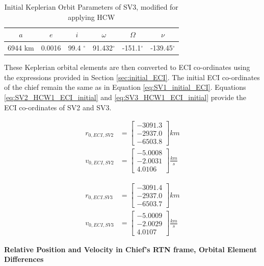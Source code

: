 \begin{table}[h]
\centering
\begin{tabular}{cccccc} \hline
    $a$ & $e$ & $i$ & $\omega$ & $\Omega$ & $\nu$ \\ \hline 
     6944 km & 0.0016 & 99.4 $^\circ$ & 91.432$^\circ$ & -151.1$^\circ$ & -139.45$^\circ$ \\ \hline
\end{tabular}
\caption{Initial Keplerian Orbit Parameters of SV3, modified for applying HCW}
\label{tab:abs_oe_kepler_SV3_HCW}
\end{table}

These Keplerian orbital elements are then converted to ECI co-ordinates using the expressions provided in Section \ref{sec:initial_ECI}. The initial ECI co-ordinates of the chief remain the same as in Equation \ref{eq:SV1_initial_ECI}. Equations \ref{eq:SV2_HCW1_ECI_initial} and \ref{eq:SV3_HCW1_ECI_initial} provide the ECI co-ordinates of SV2 and SV3. 


\begin{align} \label{eq:SV2_HCW1_ECI_initial}
    r_{0, ECI, SV2} &= \begin{bmatrix}
        -3091.3 \\
        -2937.0 \\
        -6503.8
    \end{bmatrix} km \\
    v_{0, ECI, SV2} &= \begin{bmatrix}
        -5.0008 \\
        -2.0031 \\
        4.0106
    \end{bmatrix} \frac{km}{s}
\end{align}


\begin{align} \label{eq:SV3_HCW1_ECI_initial}
    r_{0, ECI. SV3} &= \begin{bmatrix}
        -3091.4 \\
        -2937.0 \\
        -6503.7
    \end{bmatrix} km \\
    v_{0, ECI, SV3} &= \begin{bmatrix}
        -5.0009 \\
        -2.0029 \\
        4.0107
    \end{bmatrix} \frac{km}{s}
\end{align}


\textbf{Relative Position and Velocity in Chief's RTN frame, Orbital Element Differences} \\

